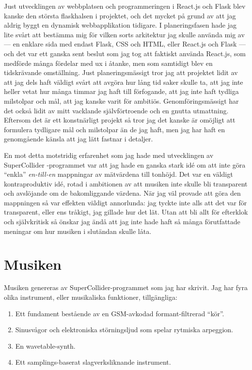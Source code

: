 \documentclass[11pt, a4paper]{article} %
\begin{document}
Just utvecklingen av webbplatsen och programmeringen i React.js och Flask blev kanske den största flaskhalsen i projektet, och det mycket på grund av att jag aldrig byggt en dynamisk webbapplikation tidigare. I planeringsfasen hade jag lite svårt att bestämma mig för vilken sorts arkitektur jag skulle använda mig av --- en enklare sida med endast Flask, CSS och HTML, eller React.js och Flask --- och det var ett ganska sent beslut som jag tog att faktiskt använda React.js, som medförde många fördelar med \gls{ux} i åtanke, men som samtidigt blev en tidskrävande omställning. Just planeringsmässigt tror jag att projektet lidit av att jag dels haft väldigt svårt att avgöra hur lång tid saker skulle ta, att jag inte heller vetat hur många timmar jag haft till förfogande, att jag inte haft tydliga milstolpar och mål, att jag kanske varit för ambitiös. Genomföringsmässigt har det också lidit av mitt vacklande självförtroende och en gnutta utmattning. Eftersom det är ett konstnärligt projekt så tror jag det kanske är omöjligt att formulera tydligare mål och milstolpar än de jag haft, men jag har haft en genomgående känsla att jag lätt fastnar i detaljer. 

En mot detta motstridig erfarenhet som jag hade med utvecklingen av SuperCollider -programmet var att jag hade en ganska stark idé om att inte göra ``enkla'' \emph{en-till-en} mappningar av mätvärdena till tonhöjd. Det var en väldigt kontraproduktiv idé, rotad i ambitionen av att musiken inte skulle bli transparent och avslöjande om de bakomliggande värdena. När jag väl provade att göra den mappningen så var effekten väldigt annorlunda: jag tyckte inte alls att det var för transparent, eller ens tråkigt, jag gillade hur det lät. Utan att bli allt för efterklok och självkritisk så önskar jag ändå att jag inte hade haft så många förutfattade meningar om hur musiken i slutändan skulle låta.

\section*{Musiken}

Musiken genereras av SuperCollider-programmet som jag har skrivit. Jag har fyra olika instrument, eller musikaliska funktioner, tillgängliga:

  \begin{enumerate}
	\item Ett fundament bestående av en GSM-avkodad formant-filtrerad ``kör''.
	\item Sinusvågor och elektroniska störningsljud som spelar rytmiska arpeggion.
	\item En wavetable-synth.
	\item Ett samplings-baserat slagverksliknande instrument.
  \end{enumerate}
\end{document}

